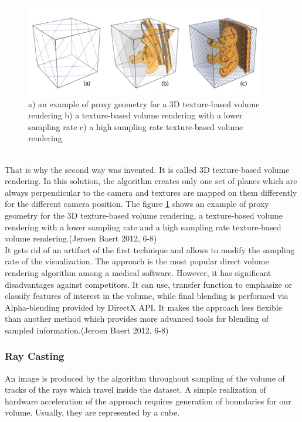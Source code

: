 \documentclass[twoside, english, 11pt]{report}
\begin{document}
\begin{figure}[!h]
\centerline{
\includegraphics[scale=0.75]{img/texture-based}
}
\caption{a) an example of proxy geometry for a 3D texture-based volume rendering b) a texture-based volume rendering with a lower sampling rate c) a high sampling rate texture-based volume rendering\label{fig:text}}
\end{figure}
\\
That is why the second way was invented. It is called 3D texture-based volume rendering. In this solution, the algorithm creates only one set of planes which are always perpendicular to the camera and textures are mapped on them differently for the different camera position. The figure \ref{fig:text} shows an example of proxy geometry for the 3D texture-based volume rendering, a texture-based volume rendering with a lower sampling rate and a high sampling rate texture-based volume rendering.(Jeroen Baert 2012, 6-8)\\

It gets rid of an artifact of the first technique and allows to modify the sampling rate of the visualization. The approach is the most popular direct volume rendering algorithm among a medical software. However, it has significant disadvantages against competitors. It can use, transfer function to emphasize or classify features of interest in the volume, while final blending is performed via Alpha-blending provided by DirectX API. It makes the approach less flexible than another method which provides more advanced tools for blending of sampled information.(Jeroen Baert 2012, 6-8)

\subsubsection{Ray Casting}

An image is produced by the algorithm throughout sampling of the volume of tracks of the rays which travel inside the dataset. A simple realization of hardware acceleration of the approach requires generation of boundaries for our volume. Usually, they are represented by a cube.\\
\end{document}

